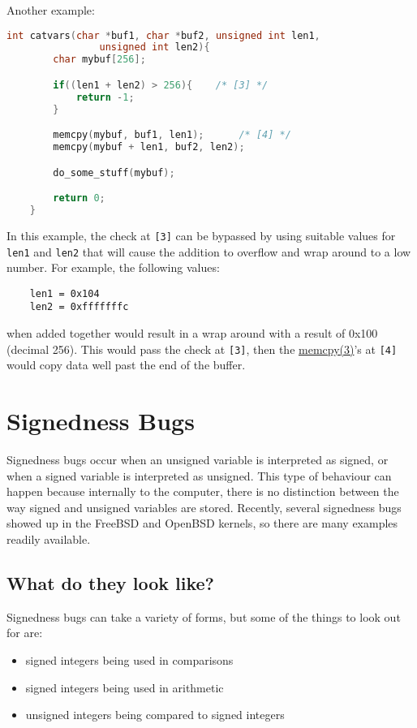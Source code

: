 \documentclass{iacrtrans}
\begin{document}
Another example:

\begin{lstlisting}[language=c]
    int catvars(char *buf1, char *buf2, unsigned int len1,
                unsigned int len2){
        char mybuf[256];

        if((len1 + len2) > 256){    /* [3] */
            return -1;
        }

        memcpy(mybuf, buf1, len1);      /* [4] */
        memcpy(mybuf + len1, buf2, len2);

        do_some_stuff(mybuf);

        return 0;
    }
\end{lstlisting}

In this example, the check at \texttt{[3]} can be bypassed by using suitable values
for \texttt{len1} and \texttt{len2} that will cause the addition to overflow and wrap around
to a low number.  For example, the following values:

\begin{verbatim}
    len1 = 0x104
    len2 = 0xfffffffc
\end{verbatim}

when added together would result in a wrap around with a result of 0x100
(decimal 256).  This would pass the check at \texttt{[3]}, then the \href{https://man7.org/linux/man-pages/man3/memcpy.3.html}{memcpy(3)}'s at
\texttt{[4]} would copy data well past the end of the buffer.



\section{Signedness Bugs}

Signedness bugs occur when an unsigned variable is interpreted as signed,
or when a signed variable is interpreted as unsigned.  This type of
behaviour can happen because internally to the computer, there is no
distinction between the way signed and unsigned variables are stored.
Recently, several signedness bugs showed up in the FreeBSD and OpenBSD
kernels, so there are many examples readily available.


\subsection{What do they look like?}

Signedness bugs can take a variety of forms, but some of the things to look
out for are:
\begin{itemize}
    \item signed integers being used in comparisons
    \item signed integers being used in arithmetic
    \item unsigned integers being compared to signed integers
\end{itemize}
\end{document}
